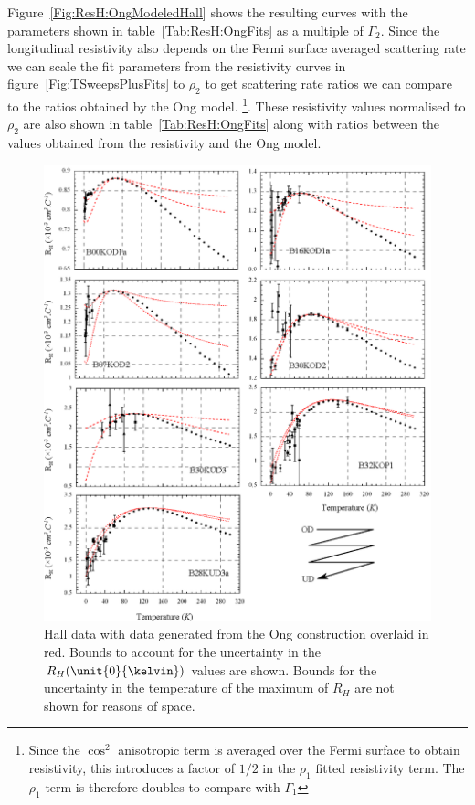 Figure~\ref{Fig:ResH:OngModeledHall} shows the resulting curves with the parameters shown in table~\ref{Tab:ResH:OngFits} as a multiple of $\Gamma_2$. Since the longitudinal resistivity also depends on the Fermi surface averaged scattering rate we can scale the fit parameters from the resistivity curves in figure~\ref{Fig:TSweepsPlusFits} to $\rho_2$ to get scattering rate ratios we can compare to the ratios obtained by the Ong model. \footnote{Since the $\cos^2$ anisotropic term is averaged over the Fermi surface to obtain resistivity, this introduces a factor of $1/2$ in the $\rho_1$ fitted resistivity term. The $\rho_1$ term is therefore doubles to compare with $\Gamma_1$}. These resistivity values normalised to $\rho_2$ are also shown in table~\ref{Tab:ResH:OngFits} along with ratios between the values obtained from the resistivity and the Ong model.
\begin{figure}[htbp]
    \begin{center}
        \includegraphics[scale=0.9]{Chapter-HallBSCO/Figures/OngFits/OngFits}
        \caption{Hall data with data generated from the Ong construction overlaid in red. Bounds to account for the uncertainty in the $R_H(\unit{0}{\kelvin})$ values are shown. Bounds for the uncertainty in the temperature of the maximum of $R_H$ are not shown for reasons of space.}
        \label{Fig:ResH:OngFits}
    \end{center}
\end{figure}

